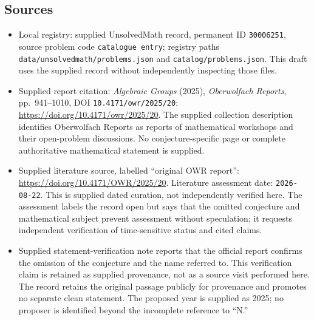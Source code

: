 \documentclass[11pt]{article}
\begin{document}
\subsection{Sources}
\begin{itemize}
\item Local registry: supplied UnsolvedMath record, permanent ID \texttt{30006251}, source problem code \texttt{catalogue entry}; registry paths \texttt{data/unsolvedmath/problems.json} and \texttt{catalog/problems.json}. This draft uses the supplied record without independently inspecting those files.
\item Supplied report citation: \emph{Algebraic Groups} (2025), \emph{Oberwolfach Reports}, pp.~941--1010, DOI \texttt{10.4171/owr/2025/20}; \url{https://doi.org/10.4171/owr/2025/20}. The supplied collection description identifies Oberwolfach Reports as reports of mathematical workshops and their open-problem discussions. No conjecture-specific page or complete authoritative mathematical statement is supplied.
\item Supplied literature source, labelled ``original OWR report'': \url{https://doi.org/10.4171/OWR/2025/20}. Literature assessment date: \texttt{2026-08-22}. This is supplied dated curation, not independently verified here. The assessment labels the record open but says that the omitted conjecture and mathematical subject prevent assessment without speculation; it requests independent verification of time-sensitive status and cited claims.
\item Supplied statement-verification note reports that the official report confirms the omission of the conjecture and the name referred to. This verification claim is retained as supplied provenance, not as a source visit performed here. The record retains the original passage publicly for provenance and promotes no separate clean statement. The proposed year is supplied as 2025; no proposer is identified beyond the incomplete reference to ``N.''
\end{itemize}
\end{document}
